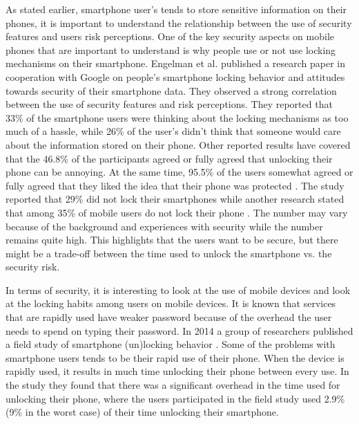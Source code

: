   As stated earlier, smartphone user's tends to store sensitive information on their phones, it is important to understand the relationship between the use of security features and users risk perceptions. One of the key security aspects on mobile phones that are important to understand is why people use or not use locking mechanisms on their smartphone. Engelman et al. \cite{Egelman} published a research paper in cooperation with Google on people's smartphone locking behavior and attitudes towards security of their smartphone data. They observed a strong correlation between the use of security features and risk perceptions. They reported that 33\% of the smartphone users were thinking about the locking mechanisms as too much of a hassle, while 26\% of the user's didn't think that someone would care about the information stored on their phone. Other reported results have covered that the 46.8\% of the participants agreed or fully agreed that unlocking their phone can be annoying. At the same time, 95.5\% of the users somewhat agreed or fully agreed that they liked the idea that their phone was protected \cite{habits3}. The study reported that 29\% did not lock their smartphones \cite{MobileUseage} while another research stated that among 35\% of mobile users do not lock their phone \cite{Bruggen}. The number may vary because of the background and experiences with security while the number remains quite high. This highlights that the users want to be secure, but there might be a trade-off between the time used to unlock the smartphone vs. the security risk.

  In terms of security, it is interesting to look at the use of mobile devices and look at the locking habits among users on mobile devices. It is known that services that are rapidly used have weaker password because of the overhead the user needs to spend on typing their password. In 2014 a group of researchers published a field study of smartphone (un)locking behavior \cite{habits3}. Some of the problems with smartphone users tends to be their rapid use of their phone. When the device is rapidly used, it results in much time unlocking their phone between every use. In the study they found that there was a significant overhead in the time used for unlocking their phone, where the users participated in the field study used 2.9\% (9\% in the worst case) of their time unlocking their smartphone.

